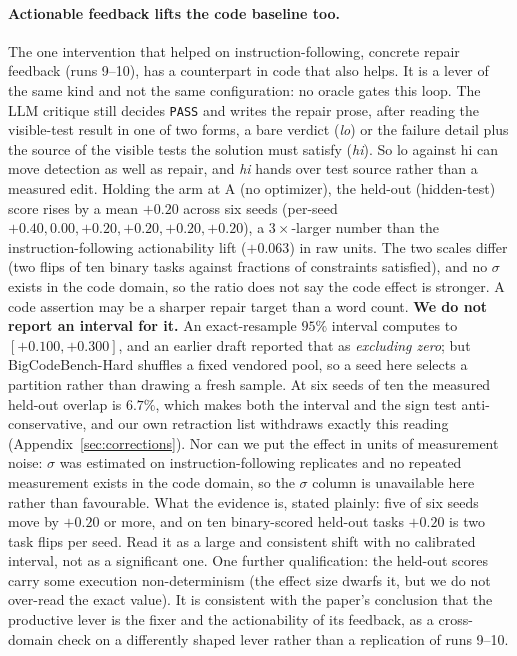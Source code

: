 \documentclass[11pt]{article}
\begin{document}
\paragraph{Actionable feedback lifts the code baseline too.} The one
intervention that helped on instruction-following, concrete repair feedback (runs 9--10), has a
counterpart in code that also helps. It is a lever of the same kind and not the same
configuration: no oracle gates this loop. The LLM critique still decides \texttt{PASS} and writes
the repair prose, after reading the visible-test result in one of two forms, a bare verdict
(\emph{lo}) or the failure detail plus the source of the visible tests the solution must
satisfy (\emph{hi}). So lo against hi can move detection as well as repair, and \emph{hi} hands over test
source rather than a measured edit. Holding the arm at A (no optimizer), the held-out (hidden-test)
score rises by
a mean $+0.20$ across six seeds (per-seed $+0.40, 0.00, +0.20, +0.20, +0.20, +0.20$), a
$3\times$-larger number than the instruction-following actionability lift ($+0.063$) in raw units.
The two scales differ (two flips of ten binary tasks against fractions of constraints satisfied),
and no $\sigma$ exists in the code domain, so the ratio does not say the code effect is stronger.
A code assertion may be a sharper repair target than a word count. \textbf{We do not report
an interval for it.} An exact-resample $95\%$ interval computes to $[+0.100, +0.300]$, and an
earlier draft reported that as \emph{excluding zero}; but BigCodeBench-Hard shuffles a fixed
vendored pool, so a seed here selects a partition rather than drawing a fresh sample. At six
seeds of ten the measured held-out overlap is $6.7\%$, which makes both the interval and the
sign test anti-conservative, and our own retraction list withdraws exactly this reading
(Appendix~\ref{sec:corrections}). Nor can we put the effect in units of measurement
noise: $\sigma$ was estimated on instruction-following replicates
and no repeated measurement exists in the code domain, so the $\sigma$
column is unavailable here rather than favourable. What the evidence is, stated plainly: five of
six seeds move by $+0.20$ or more, and on ten binary-scored held-out tasks $+0.20$ is two task
flips per seed. Read it as a large and consistent shift with no calibrated interval, not as a
significant one. One further qualification: the held-out scores carry some
execution non-determinism (the effect size dwarfs it, but we do not over-read the exact value). It is consistent with the paper's conclusion that the productive lever is the fixer and the
actionability of its feedback, as a cross-domain check on a differently shaped lever rather than a
replication of runs 9--10.
\end{document}

